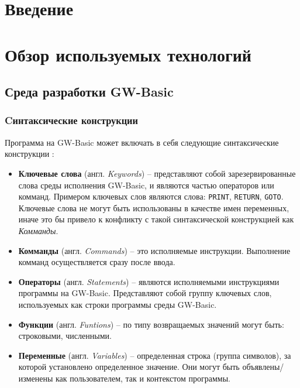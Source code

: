 \documentclass[12pt]{article}
\begin{document}
	\section{Введение}
	\newpage
	\section{Обзор используемых технологий}	
		\subsection{Среда разработки GW-Basic}
			
			
			\subsubsection{Cинтаксические конструкции}
			\hspace{\parindent} Программа на GW-Basic может включать в себя следующие синтаксические конструкции \cite{basicManual}:
			\begin{itemize}
				\item {\bf Ключевые слова} (англ. {\it Keywords}) -- представляют собой зарезервированные слова среды исполнения GW-Basic, и являются частью операторов или комманд. Примером ключевых слов являются слова: {\tt PRINT}, {\tt RETURN}, {\tt GOTO}. Ключевые слова не могут быть использованы в качестве имен переменных, иначе это бы привело к конфликту с такой синтаксической конструкцией как {\it Комманды}.
				\item {\bf Комманды} (англ. { \it Commands}) -- это исполняемые инструкции. Выполнение комманд осуществляется сразу после ввода.
				\item {\bf Операторы} (англ. {\it Statements}) -- являются исполняемыми инструкциями программы на GW-Basic. Представляют собой группу ключевых слов, используемых как строки программы среды GW-Basic.
				\item {\bf Функции} (англ. {\it Funtions}) -- по типу возвращаемых значений могут быть: строковыми, численными.
				\item {\bf Переменные} (англ. {\it Variables}) -- определенная строка (группа символов), за которой установлено определенное значение. Они могут быть объявлены/изменены как пользователем, так и контекстом программы.
			\end{itemize}
			
\end{document}
